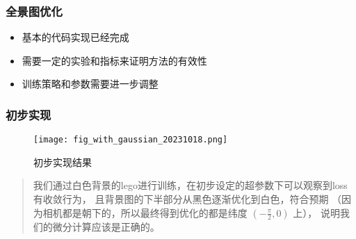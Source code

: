 
\begin{frame}
    \frametitle{全景图优化}
    \begin{itemize}
        \item 基本的代码实现已经完成
        \item 需要一定的实验和指标来证明方法的有效性
        \item 训练策略和参数需要进一步调整
    \end{itemize}
\end{frame}

\begin{frame}
    \frametitle{初步实现}
    \begin{figure}
        \texttt{[image: fig\_with\_gaussian\_20231018.png]}
        \caption[short]{初步实现结果}
    \end{figure}
    \begin{quote}
        我们通过白色背景的lego进行训练，在初步设定的超参数下可以观察到loss有收敛行为，
        且背景图的下半部分从黑色逐渐优化到白色，符合预期
        （因为相机都是朝下的，所以最终得到优化的都是纬度 $(-\frac{\pi}{2}, 0)$ 上），
        说明我们的微分计算应该是正确的。
    \end{quote}
\end{frame}
